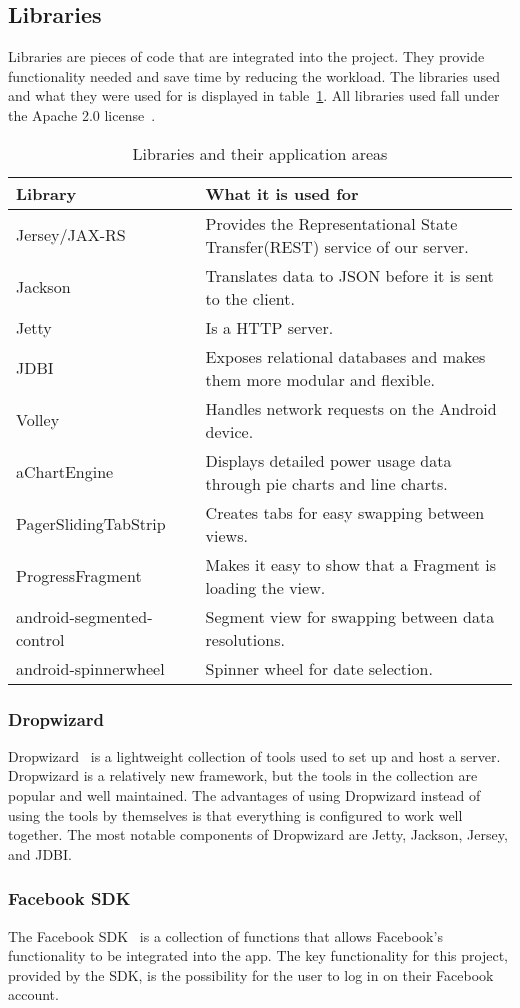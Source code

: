 \subsection{Libraries}
\label{sec:libraries}
Libraries are pieces of code that are integrated into the project. They provide functionality needed and save time by reducing the workload. The libraries used and what they were used for is displayed in table~\ref{tab:libs}.
 All libraries used fall under the Apache 2.0 license~\cite{apache}.

\begin{table}[H]
\begin{tabular}{|l|p{10.4cm}|}
\hline
\textbf{Library }& \textbf{What it is used for}\\\hline
Jersey/JAX-RS~\cite{jersey} & Provides the Representational State Transfer(REST) service of our server.\\\hline
Jackson~\cite{jackson}&Translates data to \gls{JSON} before it is sent to the client.\\\hline
Jetty~\cite{jetty}&Is a HTTP server.\\\hline
JDBI~\cite{jdbi}&Exposes relational databases and makes them more modular and flexible.\\\hline
Volley~\cite{volley}& Handles network requests on the Android device.\\\hline
aChartEngine~\cite{achart}& Displays detailed power usage data through pie charts and line charts.\\\hline
PagerSlidingTabStrip~\cite{psts}& Creates tabs for easy swapping between views.\\\hline
ProgressFragment~\cite{progressfragment}& Makes it easy to show that a Fragment is loading the view.\\\hline
android-segmented-control~\cite{segments}& Segment view for swapping between data resolutions.\\\hline
android-spinnerwheel\cite{spinnerwheel}& Spinner wheel for date selection.\\\hline
\end{tabular}
\caption{Libraries and their application areas}
\label{tab:libs}
\end{table}

\subsubsection{Dropwizard}
Dropwizard~\cite{dropwizard} is a lightweight collection of tools used to set up and host a server. Dropwizard is a relatively new framework, but the tools in the collection are popular and well maintained. 
The advantages of using Dropwizard instead of using the tools by themselves is that everything is configured to work well together. The most notable components of Dropwizard are Jetty, Jackson, Jersey, and JDBI.

\subsubsection{Facebook SDK}
The Facebook SDK~\cite{fsdk} is a collection of functions that allows Facebook's functionality to be integrated into the app. The key functionality for this project, provided by the SDK, is the possibility for the user to log in on their Facebook account.

